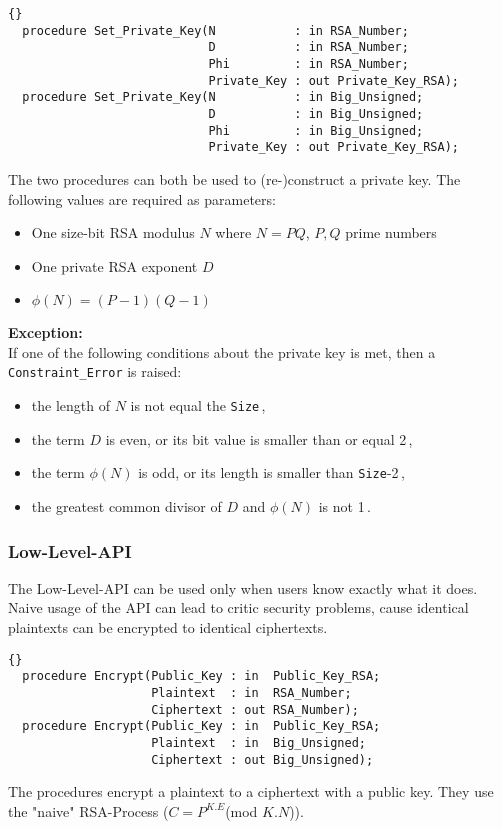 \hhline
\begin{lstlisting}{}
  procedure Set_Private_Key(N           : in RSA_Number;
                            D           : in RSA_Number;
                            Phi         : in RSA_Number;
                            Private_Key : out Private_Key_RSA);
  procedure Set_Private_Key(N           : in Big_Unsigned;
                            D           : in Big_Unsigned;
                            Phi         : in Big_Unsigned;
                            Private_Key : out Private_Key_RSA);
\end{lstlisting}
The two procedures can both be used to (re-)construct a private
key. The following values are required as parameters:
\begin{itemize}
\item One size-bit RSA modulus $N$ where $N=PQ$, $P,Q$ prime numbers
\item One private RSA exponent $D$
\item $\phi(N)=(P-1)(Q-1)$
\end{itemize}
\textbf{Exception:}\\ If one of the following conditions about the
private key is met, then a \texttt{Constraint\_Error} is raised:
\begin{itemize}
\item the length of $N$ is not equal the \texttt{Size}\,,
\item the term $D$ is even, or its bit value is smaller than or equal 2\,,
\item the term $\phi(N)$ is odd, or its length is smaller than
  \texttt{Size}-2\,,
\item the greatest common divisor of $D$ and $\phi(N)$ is not 1\,.
\end{itemize}

\subsubsection*{Low-Level-API}
The Low-Level-API can be used only when users know exactly what it
does. Naive usage of the API can lead to critic security problems,
cause identical plaintexts can be encrypted to identical ciphertexts.
\begin{lstlisting}{}
  procedure Encrypt(Public_Key : in  Public_Key_RSA;
                    Plaintext  : in  RSA_Number;
                    Ciphertext : out RSA_Number);
  procedure Encrypt(Public_Key : in  Public_Key_RSA;
                    Plaintext  : in  Big_Unsigned;
                    Ciphertext : out Big_Unsigned);
\end{lstlisting}
The procedures encrypt a plaintext to a ciphertext with a public
key. They use the "naive" RSA-Process ($C=P^{K.E}$(mod $K.N$)).\\


